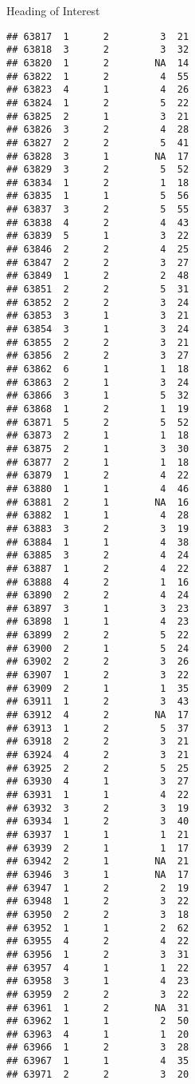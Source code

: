 \documentclass[
  ignorenonframetext,
]{beamer}
\begin{document}
\begin{frame}[fragile]{Heading of Interest}
\begin{verbatim}
## 63817  1      2         3  21
## 63818  3      2         3  32
## 63820  1      2        NA  14
## 63822  1      2         4  55
## 63823  4      1         4  26
## 63824  1      2         5  22
## 63825  2      1         3  21
## 63826  3      2         4  28
## 63827  2      2         5  41
## 63828  3      1        NA  17
## 63829  3      2         5  52
## 63834  1      2         1  18
## 63835  1      1         5  56
## 63837  3      2         5  55
## 63838  4      2         4  43
## 63839  5      1         3  22
## 63846  2      2         4  25
## 63847  2      2         3  27
## 63849  1      2         2  48
## 63851  2      2         5  31
## 63852  2      2         3  24
## 63853  3      1         3  21
## 63854  3      1         3  24
## 63855  2      2         3  21
## 63856  2      2         3  27
## 63862  6      1         1  18
## 63863  2      1         3  24
## 63866  3      1         5  32
## 63868  1      2         1  19
## 63871  5      2         5  52
## 63873  2      1         1  18
## 63875  2      1         3  30
## 63877  2      1         1  18
## 63879  1      2         4  22
## 63880  1      1         4  46
## 63881  2      1        NA  16
## 63882  1      1         4  28
## 63883  3      2         3  19
## 63884  1      1         4  38
## 63885  3      2         4  24
## 63887  1      2         4  22
## 63888  4      2         1  16
## 63890  2      2         4  24
## 63897  3      1         3  23
## 63898  1      1         4  23
## 63899  2      2         5  22
## 63900  2      1         5  24
## 63902  2      2         3  26
## 63907  1      2         3  22
## 63909  2      1         1  35
## 63911  1      2         3  43
## 63912  4      2        NA  17
## 63913  1      2         5  37
## 63918  2      2         3  21
## 63924  4      2         3  21
## 63925  2      2         5  25
## 63930  4      1         3  27
## 63931  1      1         4  22
## 63932  3      2         3  19
## 63934  1      2         3  40
## 63937  1      1         1  21
## 63939  2      1         1  17
## 63942  2      1        NA  21
## 63946  3      1        NA  17
## 63947  1      2         2  19
## 63948  1      2         3  22
## 63950  2      2         3  18
## 63952  1      1         2  62
## 63955  4      2         4  22
## 63956  1      2         3  31
## 63957  4      1         1  22
## 63958  3      1         4  23
## 63959  2      2         3  22
## 63961  1      2        NA  31
## 63962  1      1         2  50
## 63963  4      1         1  20
## 63966  1      2         3  28
## 63967  1      1         4  35
## 63971  2      2         3  20

\end{verbatim}
\end{frame}
\end{document}
